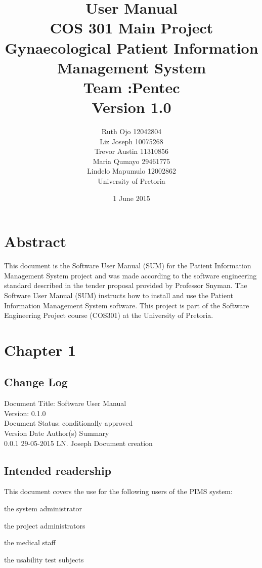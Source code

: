 \documentclass[a4paper]{article}
\title{User Manual
\\COS 301 Main Project
\\Gynaecological Patient Information Management System
\\Team :Pentec
\\Version 1.0}
\author{Ruth Ojo 12042804
\\Liz Joseph 10075268
\\Trevor Austin 11310856
\\Maria Qumayo 29461775
\\Lindelo Mapumulo 12002862
\\ University of Pretoria}
\date{1 June 2015}
\begin{document}
\maketitle
\newpage


\tableofcontents
\newpage


\section{Abstract}
This document is the Software User Manual (SUM) for the Patient Information Management System project and was made according to the software engineering standard described in the tender proposal provided by Professor Snyman. The Software User Manual (SUM) instructs how to install and use the
Patient Information Management System software. This project is part of the Software Engineering Project course (COS301) at the University of Pretoria.\\

\newpage

\section{Chapter 1}



\subsection{Change Log}
Document Title: Software User Manual\\
Version: 0.1.0\\
Document Status: conditionally approved\\
Version Date Author(s) Summary\\
0.0.1 29-05-2015 LN. Joseph Document creation\\


\subsection{Intended readership}
This document covers the use for the following users of the PIMS system:\\
\begin{description}
\item the system administrator
\item the project administrators
\item the medical staff
\item the usability test subjects
\end{description}
\end{document}

